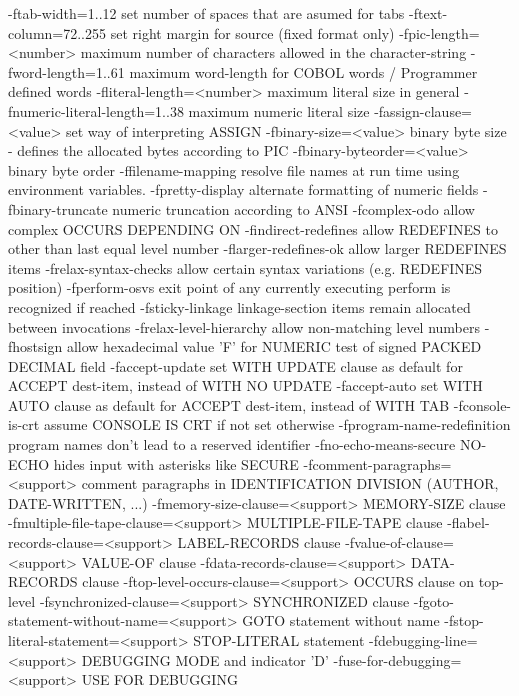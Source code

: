   -ftab-width=1..12    	set number of spaces that are asumed for tabs
  -ftext-column=72..255	set right margin for source (fixed format only)
  -fpic-length=<number>	maximum number of characters allowed in the character-string
  -fword-length=1..61  	maximum word-length for COBOL words / Programmer defined words
  -fliteral-length=<number>	maximum literal size in general
  -fnumeric-literal-length=1..38	maximum numeric literal size
  -fassign-clause=<value>	set way of interpreting ASSIGN
  -fbinary-size=<value>	binary byte size - defines the allocated bytes according to PIC
  -fbinary-byteorder=<value>	binary byte order
  -ffilename-mapping   	resolve file names at run time using environment variables.
  -fpretty-display     	alternate formatting of numeric fields
  -fbinary-truncate    	numeric truncation according to ANSI
  -fcomplex-odo        	allow complex OCCURS DEPENDING ON
  -findirect-redefines 	allow REDEFINES to other than last equal level number
  -flarger-redefines-ok	allow larger REDEFINES items
  -frelax-syntax-checks	allow certain syntax variations (e.g. REDEFINES position)
  -fperform-osvs       	exit point of any currently executing perform is recognized if reached
  -fsticky-linkage     	linkage-section items remain allocated between invocations
  -frelax-level-hierarchy	allow non-matching level numbers
  -fhostsign           	allow hexadecimal value 'F' for NUMERIC test of signed PACKED DECIMAL field
  -faccept-update      	set WITH UPDATE clause as default for ACCEPT dest-item, instead of WITH NO UPDATE
  -faccept-auto        	set WITH AUTO clause as default for ACCEPT dest-item, instead of WITH TAB
  -fconsole-is-crt     	assume CONSOLE IS CRT if not set otherwise
  -fprogram-name-redefinition	program names don't lead to a reserved identifier
  -fno-echo-means-secure	NO-ECHO hides input with asterisks like SECURE
  -fcomment-paragraphs=<support>	comment paragraphs in IDENTIFICATION DIVISION (AUTHOR, DATE-WRITTEN, ...)
  -fmemory-size-clause=<support>	MEMORY-SIZE clause
  -fmultiple-file-tape-clause=<support>	MULTIPLE-FILE-TAPE clause
  -flabel-records-clause=<support>	LABEL-RECORDS clause
  -fvalue-of-clause=<support>	VALUE-OF clause
  -fdata-records-clause=<support>	DATA-RECORDS clause
  -ftop-level-occurs-clause=<support>	OCCURS clause on top-level
  -fsynchronized-clause=<support>	SYNCHRONIZED clause
  -fgoto-statement-without-name=<support>	GOTO statement without name
  -fstop-literal-statement=<support>	STOP-LITERAL statement
  -fdebugging-line=<support>	DEBUGGING MODE and indicator 'D'
  -fuse-for-debugging=<support>	USE FOR DEBUGGING
